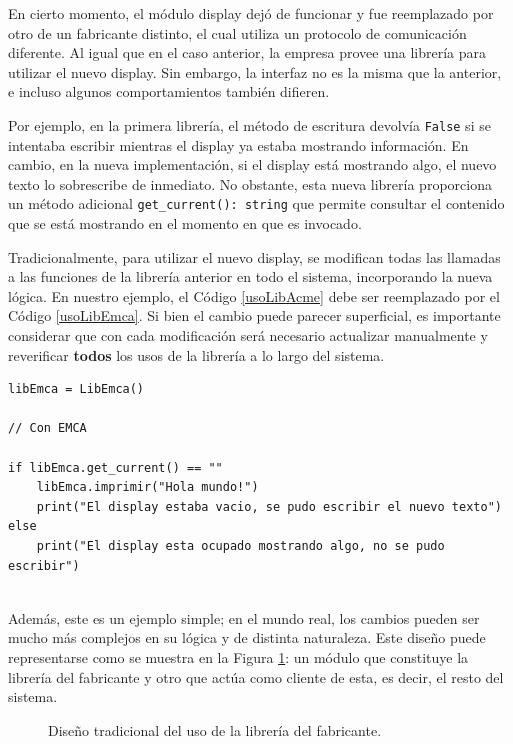 En cierto momento, el módulo display dejó de funcionar y fue reemplazado por otro de un fabricante distinto, el cual utiliza un protocolo de comunicación diferente. Al igual que en el caso anterior, la empresa provee una librería \LibEmca para utilizar el nuevo display. Sin embargo, la interfaz no es la misma que la anterior, e incluso algunos comportamientos también difieren.

Por ejemplo, en la primera librería, el método de escritura devolvía \verb|False| si se intentaba escribir mientras el display ya estaba mostrando información. En cambio, en la nueva implementación, si el display está mostrando algo, el nuevo texto lo sobrescribe de inmediato. No obstante, esta nueva librería proporciona un método adicional \verb|get_current(): string| que permite consultar el contenido que se está mostrando en el momento en que es invocado.

Tradicionalmente, para utilizar el nuevo display, se modifican todas las llamadas a las funciones de la librería anterior en todo el sistema, incorporando la nueva lógica. En nuestro ejemplo, el Código \ref{usoLibAcme} debe ser reemplazado por el Código \ref{usoLibEmca}. Si bien el cambio puede parecer superficial, es importante considerar que con cada modificación será necesario actualizar manualmente y reverificar \textbf{todos} los usos de la librería a lo largo del sistema.
\begin{lstlisting}[label={usoLibEmca}, caption=Ejemplo de modificaciones necesarias para adaptar la nueva librería.]
libEmca = LibEmca()

// Con EMCA

if libEmca.get_current() == ""
	libEmca.imprimir("Hola mundo!")
	print("El display estaba vacio, se pudo escribir el nuevo texto")
else
	print("El display esta ocupado mostrando algo, no se pudo escribir")


\end{lstlisting}

Además, este es un ejemplo simple; en el mundo real, los cambios pueden ser mucho más complejos en su lógica y de distinta naturaleza. Este diseño puede representarse como se muestra en la Figura \ref{configOri}: un módulo que constituye la librería del fabricante y otro que actúa como cliente de esta, es decir, el resto del sistema.


\begin{figure}[H]
\caption{Diseño tradicional del uso de la librería del fabricante.}
\label{configOri}
\begin{center}
\end{center}
\end{figure}


